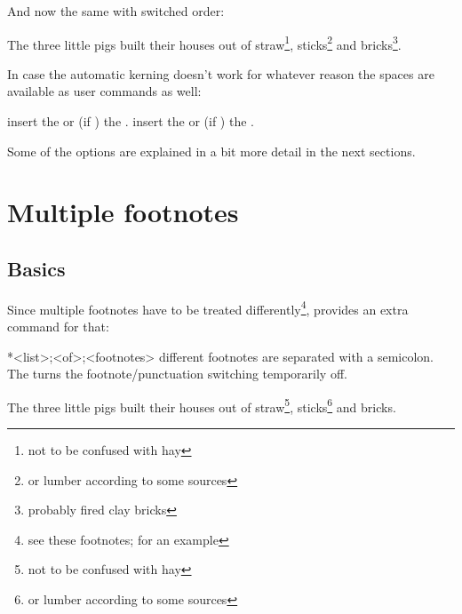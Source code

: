 \documentclass[toc=index,toc=bib]{cnpkgdoc}
\begin{document}
And now the same with switched order:
\begin{beispiel}
 \begin{minipage}{.4\linewidth}
  \noindent The three little pigs built their houses
  out of straw\footnote{not to be confused with hay},
  sticks\footnote{or lumber according to some sources}
  and bricks\footnote{probably fired clay bricks}.
 \end{minipage}
\end{beispiel}

In case the automatic kerning doesn't work for whatever reason the spaces are
available as user commands as well:
\begin{beschreibung}
 \newline
   insert the  or (if ) the
   .
 \newline
   insert the  or (if ) the
   .
\end{beschreibung}

Some of the options are explained in a bit more detail in the next sections.

\section{Multiple footnotes}\label{sec:multiple}
\subsection{Basics}
Since multiple footnotes have to be treated differently\footnote{see these footnotes;%
for an example}, \fnpct provides an extra command for that:
\begin{beschreibung}
 *{<list>;<of>;<footnotes>}\newline
   different footnotes are separated with a semicolon. The \code{*} turns the
   footnote/punctuation switching temporarily off.
\end{beschreibung}
\begin{beispiel}
 \begin{minipage}{.4\linewidth}
  \noindent The three little pigs built their houses
  out of straw\footnote{not to be confused with hay},
  sticks\footnote{or lumber according to some sources}
  and bricks.
 \end{minipage}
\end{beispiel}
\end{document}
